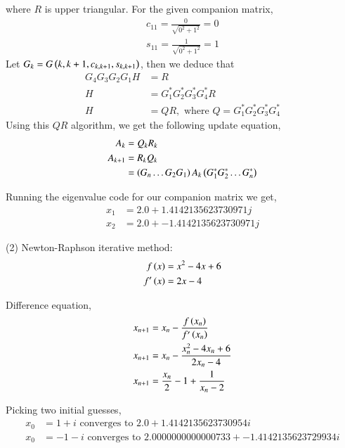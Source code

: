 \documentclass[journal]{IEEEtran}
\begin{document}
where $R$ is upper triangular.
For the given companion matrix,
\begin{align}
  c_{11} = \frac{0}{\sqrt{0^2 + 1^2}} = 0\\
  s_{11} = \frac{1}{\sqrt{0^2 + 1^2}} = 1
\end{align}
Let $G_k = G\left(k, k + 1, c_{k, k+1}, s_{k, k+1}\right)$, then we deduce that
\begin{align}
    G_4 G_3 G_2 G_1 H &= R\\
    H &= G_1^{\ast} G_2^{\ast} G_3^{\ast} G_4^{\ast} R\\
    H &= QR, \text{ where } Q = G_1^{\ast} G_2^{\ast} G_3^{\ast} G_4^{\ast}
\end{align}
Using this $QR$ algorithm, we get the following update equation,
\begin{align}
  A_{k} &= Q_{k}R_{k}\\
  A_{k + 1} &= R_{k}Q_{k}\\
            &= \left(G_{n}\dots G_{2} G_{1}\right) A_{k} \left(G_1^{\ast} G_2^{\ast} \dots G_n^{\ast}\right)
\end{align}

Running the eigenvalue code for our companion matrix we get,
\begin{align}
    x_1 &= 2.0 + 1.4142135623730971j\\
    x_2 &= 2.0 + -1.4142135623730971j
\end{align}

(2) Newton-Raphson iterative method:
\begin{align}
    f\left(x\right) &= x^2 - 4x + 6 \\
    f^\prime\left(x\right) &= 2x - 4
\end{align}

Difference equation,
\begin{align}
    x_{n+1} &= x_n - \frac{f\left(x_{n}\right)}{f^\prime\left(x_n\right)} \\
    x_{n+1} &= x_n - \frac{x_n^2 - 4x_n + 6}{2x_n - 4} \\
    x_{n+1} &= \frac{x_n}{2} - 1 + \frac{1}{x_n - 2}
\end{align}

Picking two initial guesses,
\begin{align}
    x_0 &= 1+i \text{ converges to } 2.0 + 1.4142135623730954i \\
    x_0 &= -1-i \text{ converges to } 2.0000000000000733 + -1.4142135623729934i
\end{align}
\end{document}
